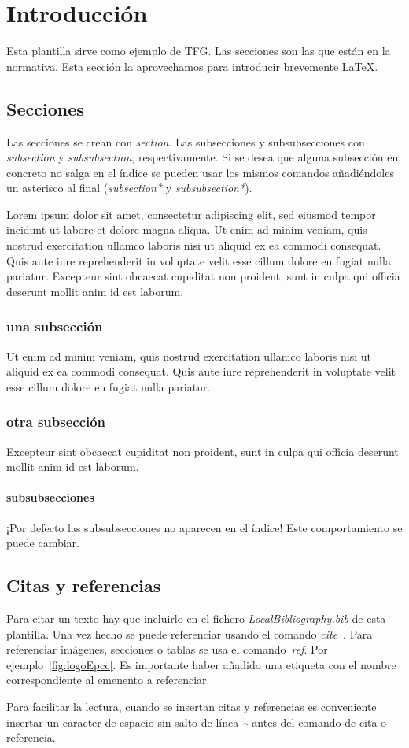 \pagestyle{fancy}
\setcounter{page}{1}

\chapter{Introducción}
Esta plantilla sirve como ejemplo de TFG. Las secciones son las que están en la normativa. Esta sección la aprovechamos para introducir brevemente \LaTeX.
\par

\section{Secciones}
Las secciones se crean con \textit{section}. Las subsecciones y subsubsecciones con \textit{subsection} y \textit{subsubsection}, respectivamente. Si se desea que alguna subsección en concreto no salga en el índice se pueden usar los mismos comandos añadiéndoles un asterisco al final (\textit{subsection*} y \textit{subsubsection*}).
\par
Lorem ipsum dolor sit amet, consectetur adipiscing elit, sed eiusmod tempor incidunt ut labore et dolore magna aliqua. Ut enim ad minim veniam, quis nostrud exercitation ullamco laboris nisi ut aliquid ex ea commodi consequat. Quis aute iure reprehenderit in voluptate velit esse cillum dolore eu fugiat nulla pariatur. Excepteur sint obcaecat cupiditat non proident, sunt in culpa qui officia deserunt mollit anim id est laborum.
\subsection{una subsección}
Ut enim ad minim veniam, quis nostrud exercitation ullamco laboris nisi ut aliquid ex ea commodi consequat. Quis aute iure reprehenderit in voluptate velit esse cillum dolore eu fugiat nulla pariatur.
\subsection{otra subsección}
Excepteur sint obcaecat cupiditat non proident, sunt in culpa qui officia deserunt mollit anim id est laborum.
\subsubsection{subsubsecciones}
¡Por defecto las subsubsecciones no aparecen en el índice! Este comportamiento se puede cambiar.

\section{Citas y referencias}
Para citar un texto hay que incluirlo en el fichero \textit{LocalBibliography.bib} de esta plantilla. Una vez hecho se puede referenciar usando el comando \textit{cite}~\cite{LaTeX_tutorials}.
Para referenciar imágenes, secciones o tablas se usa el comando~\textit{ref}. Por ejemplo~\ref{fig:logoEpcc}. Es importante haber añadido una etiqueta con el nombre correspondiente al emenento a referenciar.
\par
Para facilitar la lectura, cuando se insertan citas y referencias es conveniente insertar un caracter de espacio sin salto de línea \textit{\~} antes del comando de cita o referencia.


